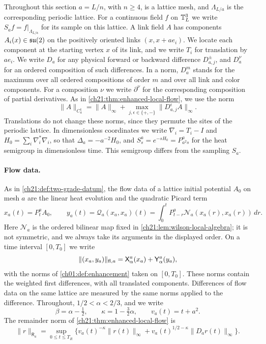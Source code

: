 Throughout this section $a=L/n$, with $n\ge4$, is a lattice mesh, and $\Lambda_{L/a}$ is the corresponding periodic lattice. For a continuous field $f$ on $\mathbb T_L^3$ we write $S_af=f|_{\Lambda_{L/a}}$ for its sample on this lattice. A link field $A$ has components $A_i(x)\in\mathfrak{su}(2)$ on the positively oriented links $(x,x+ae_i)$. We locate each component at the starting vertex $x$ of its link, and we write $T_i$ for translation by $ae_i$. We write $D_a$ for any physical forward or backward difference $D^\pm_{a,j}$, and $D_a^\nu$ for an ordered composition of such differences. In a norm, $D_a^m$ stands for the maximum over all ordered compositions of order $m$ and over all link and color components. For a composition $\nu$ we write $\partial^\nu$ for the corresponding composition of partial derivatives. As in \cref{ch21:thm:enhanced-local-flow}, we use the norm
\[
 \|A\|_{C_a^1}=\|A\|_\infty+\max_{j,\epsilon\in\{+,-\}}\|D_{a,j}^{\epsilon}A\|_\infty .
\]
Translations do not change these norms, since they permute the sites of the periodic lattice. In dimensionless coordinates we write $\nabla_i=T_i-I$ and $H_0=\sum_i\nabla_i^*\nabla_i$, so that $\Delta_a=-a^{-2}H_0$, and $S_s^a=e^{-sH_0}=P_{a^2s}^a$ for the heat semigroup in dimensionless time. This semigroup differs from the sampling $S_a$.

\paragraph{Flow data.}
As in \cref{ch21:def:two-grade-datum}, the flow data of a lattice initial potential $A_0$ on mesh $a$ are the linear heat evolution and the quadratic Picard term
\[
 x_a(t)=P_t^aA_0,\qquad
 y_a(t)=\mathcal Q_a(x_a,x_a)(t)=\int_0^tP_{t-r}^a\mathcal N_a(x_a(r),x_a(r))\,dr .
\]
Here $\mathcal N_a$ is the ordered bilinear map fixed in \cref{ch21:lem:wilson-local-algebra}; it is not symmetric, and we always take its arguments in the displayed order. On a time interval $[0,T_0]$ we write
\[
 \|(x_a,y_a)\|_{\mathrm{fl},a}=\mathsf X_{\alpha}^{a}(x_a)+\mathsf Y_{\alpha}^{a}(y_a),
\]
with the norms of \cref{ch01:def:enhancement} taken on $[0,T_0]$. These norms contain the weighted first differences, with all translated components. Differences of flow data on the same lattice are measured by the same norms applied to the difference. Throughout, $1/2<\alpha<2/3$, and we write
\[
 \beta=\alpha-\tfrac12,\qquad \kappa=1-\tfrac32\alpha,\qquad v_a(t)=t+a^2 .
\]
The remainder norm of \cref{ch21:thm:enhanced-local-flow} is
\[
 \|r\|_{\mathsf R_a}=\sup_{0\le t\le T_R}\bigl\{v_a(t)^{-\kappa}\|r(t)\|_\infty+v_a(t)^{1/2-\kappa}\|D_ar(t)\|_\infty\bigr\}.
\]

